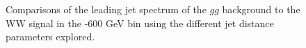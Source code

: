 \begin{figure}
\begin{center}
\caption{Comparisons of the leading jet \pt spectrum of the $gg$
  background to the WW signal in the -600 GeV bin using the
  different \antikt jet distance parameters explored.}
\label{fig:pt500_basics}
\end{center}
\end{figure}

